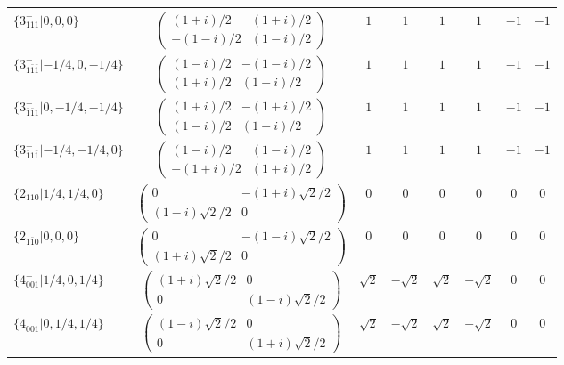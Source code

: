\documentclass[3p,preprint]{elsarticle}
\begin{document}
\begin{table}[H]
{\begin{tabular}{|l|c||c|c|c|c|c|c|}
			$\{3^{-}_{111}|0,0,0\}$ &		$\left(\begin{array}{cc} (1+i)/2&(1+i)/2 \\ -(1-i)/2&(1-i)/2 \end{array}\right)$	&$1$ & $1$ & $1$ & $1$ & $-1$ & $-1$ \\ \hline
			$\{3^{-}_{1\bar{1}\bar{1}}|-1/4,0,-1/4\}$ &		$\left(\begin{array}{cc} (1-i)/2&-(1-i)/2 \\ (1+i)/2&(1+i)/2 \end{array}\right)$	&$1$ & $1$ & $1$ & $1$ & $-1$ & $-1$ \\ \hline
			$\{3^{-}_{\bar{1}\bar{1}1}|0,-1/4,-1/4\}$ &		$\left(\begin{array}{cc} (1+i)/2&-(1+i)/2 \\ (1-i)/2&(1-i)/2 \end{array}\right)$	&$1$ & $1$ & $1$ & $1$ & $-1$ & $-1$ \\ \hline
			$\{3^{-}_{\bar{1}1\bar{1}}|-1/4,-1/4,0\}$ &		$\left(\begin{array}{cc} (1-i)/2&(1-i)/2 \\ -(1+i)/2&(1+i)/2 \end{array}\right)$	&$1$ & $1$ & $1$ & $1$ & $-1$ & $-1$ \\ \hline
			$\{2_{110}|1/4,1/4,0\}$ &		$\left(\begin{array}{cc} 0&-(1+i)\sqrt{2}/2 \\ (1-i)\sqrt{2}/2&0 \end{array}\right)$	&$0$ & $0$ & $0$ & $0$ & $0$ & $0$ \\ \hline
			$\{2_{1\bar{1}0}|0,0,0\}$ &		$\left(\begin{array}{cc} 0&-(1-i)\sqrt{2}/2 \\ (1+i)\sqrt{2}/2&0 \end{array}\right)$	&$0$ & $0$ & $0$ & $0$ & $0$ & $0$ \\ \hline
			$\{4^{-}_{001}|1/4,0,1/4\}$ &		$\left(\begin{array}{cc} (1+i)\sqrt{2}/2&0 \\ 0&(1-i)\sqrt{2}/2 \end{array}\right)$	&$\sqrt{2}$ & $-\sqrt{2}$ & $\sqrt{2}$ & $-\sqrt{2}$ & $0$ & $0$ \\ \hline
			$\{4^{+}_{001}|0,1/4,1/4\}$ &		$\left(\begin{array}{cc} (1-i)\sqrt{2}/2&0 \\ 0&(1+i)\sqrt{2}/2 \end{array}\right)$	&$\sqrt{2}$ & $-\sqrt{2}$ & $\sqrt{2}$ & $-\sqrt{2}$ & $0$ & $0$ \\ \hline

\end{tabular}}
\end{table}
\end{document}
